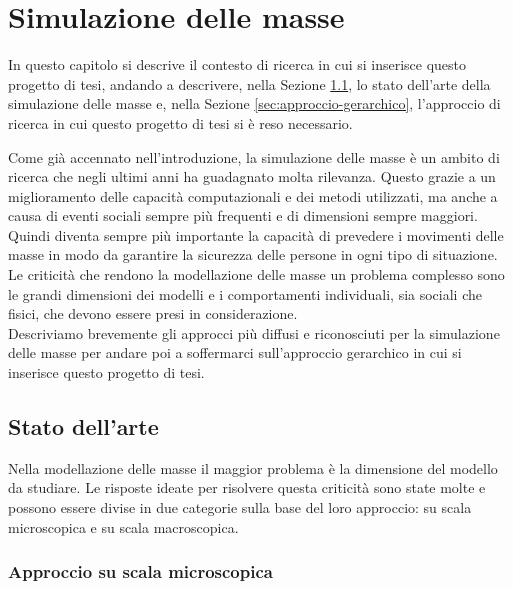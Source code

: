 \chapter{Simulazione delle masse}
In questo capitolo si descrive il contesto di ricerca in cui si inserisce questo progetto di tesi, andando a descrivere, nella Sezione \ref{sec:stato-dell-arte}, lo stato dell'arte della simulazione delle masse e, nella Sezione \ref{sec:approccio-gerarchico}, l'approccio di ricerca in cui questo progetto di tesi si è reso necessario.

\label{sec:simulazione-masse}
Come già accennato nell'introduzione, la simulazione delle masse è un ambito di ricerca che negli ultimi anni ha guadagnato molta rilevanza. Questo grazie a un miglioramento delle capacità computazionali e dei metodi utilizzati, ma anche a causa di eventi sociali sempre più frequenti e di dimensioni sempre maggiori. Quindi diventa sempre più importante la capacità di prevedere i movimenti delle masse in modo da garantire la sicurezza delle persone in ogni tipo di situazione.\\
Le criticità che rendono la modellazione delle masse un problema complesso sono le grandi dimensioni dei modelli e i comportamenti individuali, sia sociali che fisici, che devono essere presi in considerazione.\\
Descriviamo brevemente gli approcci più diffusi e riconosciuti per la simulazione delle masse per andare poi a soffermarci sull'approccio gerarchico in cui si inserisce questo progetto di tesi.

\section{Stato dell'arte}
\label{sec:stato-dell-arte}

Nella modellazione delle masse il maggior problema è la dimensione del modello da studiare. Le risposte ideate per risolvere questa criticità sono state molte e possono essere divise in due categorie sulla base del loro approccio: su scala microscopica e su scala macroscopica.\\

\subsection{Approccio su scala microscopica}

